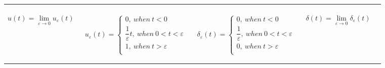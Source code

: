 \documentclass[aspectratio=169]{beamer}
\begin{document}
\begin{frame}[fragile]
\begin{tabular}{ll}
\begin{columns}
\begin{column}{0.25\textwidth}
		\end{column}		
	\end{columns}\\	
	\begin{columns}
		\begin{column}{0.25\textwidth}  %
$$u(t)=\lim_{\varepsilon \to 0} u_{\varepsilon}(t)$$

		\end{column}
		\begin{column}{0.25\textwidth}  %
\tiny $$
	    u_{\varepsilon} (t)=
	    \begin{cases}
	    0, \ when \ t < 0 \\
	    \dfrac{1}{\varepsilon}t, \ when \ 0 < t < \varepsilon \\
	    1, \ when \ t > \varepsilon\\	    
	    \end{cases}
	    $$

		\end{column}
		\begin{column}{0.25\textwidth}  %
\tiny $$
	    \delta_{\varepsilon} (t)=
	    \begin{cases}
	    0, \ when \ t < 0 \\
	    \dfrac{1}{\varepsilon}, \ when \ 0 < t < \varepsilon \\
	    0, \ when \ t > \varepsilon\\	    
	    \end{cases}
	    $$

		\end{column}
		\begin{column}{0.25\textwidth}  %
$$\delta(t)=\lim_{\varepsilon \to 0} \delta_{\varepsilon}(t)$$

		\end{column}		
	\end{columns}\\		
	
	
	
\end{tabular}
\end{frame}
\end{document}
